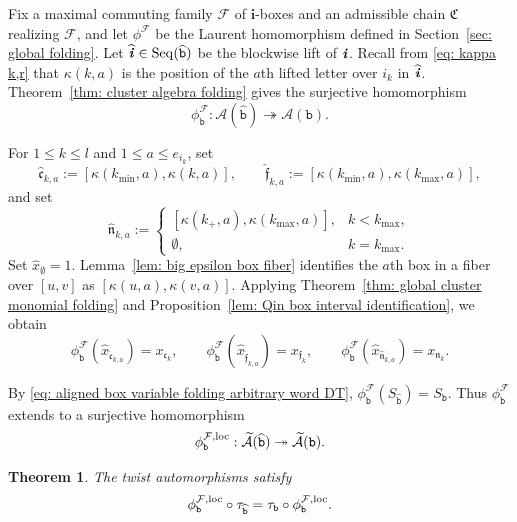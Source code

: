 \documentclass[12pt, leqno]{amsart}
\numberwithin{equation}{section}
\theoremstyle{plain}
\newtheorem{theorem}[lemma]{Theorem}
\theoremstyle{definition}
\renewcommand{\le}{\leqslant}
\newcommand{\seteq}{\mathbin{:=}}
\newcommand{\loc}{{\rm loc}}
\newcommand{\ii}{ \textbf{\textit{i}}}
\newcommand{\hx}{\widehat{x}}
\newcommand{\hii}{{\widehat{\ii}}}
\newcommand{\frakC}{\mathfrak{C}}
\newcommand{\frakc}{\mathfrak{c}}
\newcommand{\frakf}{\mathfrak{f}}
\newcommand{\frakn}{\mathfrak{n}}
\newcommand{\hfrakc}{\widehat{\frakc}}
\newcommand{\hfrakf}{\widehat{\frakf}}
\newcommand{\hfrakn}{\widehat{\frakn}}
\newcommand{\bfi}{\mathbf{i}}
\newcommand{\calA}{\mathcal{A}}
\newcommand{\calF}{\mathcal{F}}
\newcommand{\tcalA}{\widetilde{\calA}}
\newcommand{\ttb}{\mathtt{b}}
\newcommand{\httb}{\widehat{\ttb}}
\newcommand{\Seq}{\mathrm{Seq}}
\begin{document}
Fix a maximal commuting family $\calF$ of $\bfi$-boxes and an
admissible chain $\frakC$ realizing $\calF$, and let
$\phi^\calF$ be the Laurent homomorphism defined in
Section~\ref{sec: global folding}.
Let $\hii\in\Seq(\httb)$  be the blockwise lift of $\ii$.{}
Recall from \eqref{eq: kappa k,r} that $\kappa(k,a)$ is the
position of the $a$th lifted letter over $i_k$ in $\hii$.
Theorem~\ref{thm: cluster algebra folding} gives the surjective homomorphism
\[
\phi^\calF_\ttb:\calA(\httb)\twoheadrightarrow\calA(\ttb).
\]

For $1\le k\le l$ and $1\le a\le e_{i_k}$, set
\[
\hfrakc_{k,a}\seteq
[\kappa(k_{\min},a),\kappa(k,a)],
\qquad
\hfrakf_{k,a}\seteq
[\kappa(k_{\min},a),\kappa(k_{\max},a)],
\]
and set
\[
\hfrakn_{k,a}\seteq
\begin{cases}
[\kappa(k_+,a),\kappa(k_{\max},a)],&k<k_{\max},\\
\emptyset,&k=k_{\max}.
\end{cases}
\]
Set $\hx_{\emptyset}=1$.
Lemma~\ref{lem: big epsilon box fiber} identifies the $a$th box
in a fiber over $[u,v]$ as $[\kappa(u,a),\kappa(v,a)]$.
Applying Theorem~\ref{thm: global cluster monomial folding} and
Proposition~\ref{lem: Qin box interval identification},
we obtain
\begin{equation}
\phi^\calF_\ttb(\hx_{\hfrakc_{k,a}})=x_{\frakc_k},
\qquad
\phi^\calF_\ttb(\hx_{\hfrakf_{k,a}})=x_{\frakf_k},
\qquad
\phi^\calF_\ttb(\hx_{\hfrakn_{k,a}})=x_{\frakn_k}.
\label{eq: aligned box variable folding arbitrary word DT}
\end{equation}

By \eqref{eq: aligned box variable folding arbitrary word DT},
$\phi^\calF_\ttb(S_{\httb})=S_\ttb$.
Thus $\phi^\calF_\ttb$ extends to a surjective homomorphism
\begin{equation}
\phi^{\calF,\loc}_\ttb:
\tcalA(\httb)
\twoheadrightarrow
\tcalA(\ttb).
\label{eq: localized arbitrary word folding for DT}
\end{equation}

\begin{theorem}
\label{thm: arbitrary positive word DT folding compatibility}
The twist automorphisms satisfy
\begin{equation}
\phi^{\calF,\loc}_\ttb\circ\tau_{\httb}
=\tau_\ttb\circ\phi^{\calF,\loc}_\ttb.
\label{eq: arbitrary positive word DT folding compatibility}
\end{equation}
\end{theorem}
\end{document}
